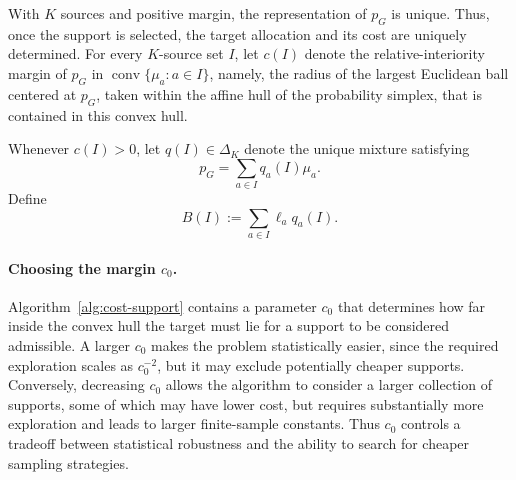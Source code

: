 \documentclass[twoside]{article}
\begin{document}
With \(K\) sources and positive margin, the representation of \(p_G\)
is unique. Thus, once the support is selected, the target allocation
and its cost are uniquely determined. 
For every \(K\)-source set \(I\), let \(c(I)\) denote the
relative-interiority margin of \(p_G\) in
\(\operatorname{conv}\{\mu_a:a\in I\}\), namely, the radius of the largest
Euclidean ball centered at \(p_G\), taken within the affine hull of the
probability simplex, that is contained in this convex hull.

Whenever \(c(I)>0\), let \(q(I)\in\Delta_K\) denote the unique mixture
satisfying
\[
p_G=\sum_{a\in I}q_a(I)\mu_a.
\]
Define
\[
B(I):=\sum_{a\in I}\ell_a q_a(I).
\]
\paragraph{Choosing the margin \(c_0\).}
Algorithm~\ref{alg:cost-support} contains a parameter \(c_0\) that determines
how far inside the convex hull the target must lie for a support to be
considered admissible. A larger \(c_0\) makes the problem statistically
easier, since the required exploration scales as \(c_0^{-2}\), but it may
exclude potentially cheaper supports. Conversely, decreasing \(c_0\) allows
the algorithm to consider a larger collection of supports, some of which may
have lower cost, but requires substantially more exploration and leads to
larger finite-sample constants. Thus \(c_0\) controls a tradeoff between
statistical robustness and the ability to search for cheaper sampling
strategies.
\end{document}
